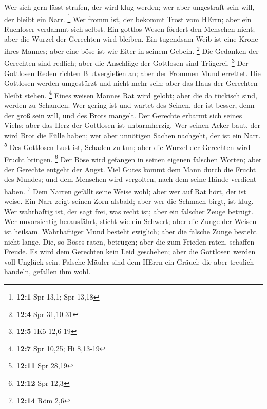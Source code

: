  Wer sich gern lässt strafen, der wird klug werden; wer
aber ungestraft sein will, der bleibt ein Narr. \footnote{\textbf{12:1}
  Spr 13,1; Spr 13,18}  Wer fromm ist, der bekommt Trost
vom HErrn; aber ein Ruchloser verdammt sich selbst.  Ein
gottlos Wesen fördert den Menschen nicht; aber die Wurzel der Gerechten
wird bleiben.  Ein tugendsam Weib ist eine Krone ihres
Mannes; aber eine böse ist wie Eiter in seinem Gebein. \footnote{\textbf{12:4}
  Spr 31,10-31}  Die Gedanken der Gerechten sind redlich;
aber die Anschläge der Gottlosen sind Trügerei. \footnote{\textbf{12:5}
  1Kö 12,6-19}  Der Gottlosen Reden richten Blutvergießen
an; aber der Frommen Mund errettet.  Die Gottlosen werden
umgestürzt und nicht mehr sein; aber das Haus der Gerechten bleibt
stehen. \footnote{\textbf{12:7} Spr 10,25; Hi 8,13-19} 
Eines weisen Mannes Rat wird gelobt; aber die da tückisch sind, werden
zu Schanden.  Wer gering ist und wartet des Seinen, der
ist besser, denn der groß sein will, und des Brots mangelt.
 Der Gerechte erbarmt sich seines Viehs; aber das Herz
der Gottlosen ist unbarmherzig.  Wer seinen Acker baut,
der wird Brot die Fülle haben; wer aber unnötigen Sachen nachgeht, der
ist ein Narr. \footnote{\textbf{12:11} Spr 28,19}  Des
Gottlosen Lust ist, Schaden zu tun; aber die Wurzel der Gerechten wird
Frucht bringen. \footnote{\textbf{12:12} Spr 12,3}  Der
Böse wird gefangen in seinen eigenen falschen Worten; aber der Gerechte
entgeht der Angst.  Viel Gutes kommt dem Mann durch die
Frucht des Mundes; und dem Menschen wird vergolten, nach dem seine Hände
verdient haben. \footnote{\textbf{12:14} Röm 2,6}  Dem
Narren gefällt seine Weise wohl; aber wer auf Rat hört, der ist weise.
 Ein Narr zeigt seinen Zorn alsbald; aber wer die Schmach
birgt, ist klug.  Wer wahrhaftig ist, der sagt frei, was
recht ist; aber ein falscher Zeuge betrügt.  Wer
unvorsichtig herausfährt, sticht wie ein Schwert; aber die Zunge der
Weisen ist heilsam.  Wahrhaftiger Mund besteht ewiglich;
aber die falsche Zunge besteht nicht lange.  Die, so
Böses raten, betrügen; aber die zum Frieden raten, schaffen Freude.
 Es wird dem Gerechten kein Leid geschehen; aber die
Gottlosen werden voll Unglück sein.  Falsche Mäuler sind
dem HErrn ein Gräuel; die aber treulich handeln, gefallen ihm wohl.
